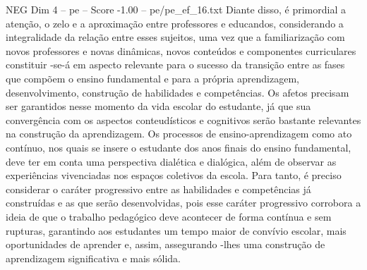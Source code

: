 \begin{textsample}{NEG Dim 4 – pe – Score -1.00 – pe/pe\_ef\_16.txt}
Diante disso, é primordial a atenção, o zelo e a aproximação entre professores e educandos, considerando a integralidade da relação entre esses sujeitos, uma vez que a familiarização com novos professores e novas dinâmicas, novos conteúdos e componentes curriculares constituir -se-á em aspecto relevante para o sucesso da transição entre as fases que compõem o ensino fundamental e para a própria aprendizagem, desenvolvimento, construção de habilidades e competências.
Os afetos precisam ser garantidos nesse momento da vida escolar do estudante, já que sua convergência com os aspectos conteudísticos e cognitivos serão bastante relevantes na construção da aprendizagem.
Os processos de ensino-aprendizagem como ato contínuo, nos quais se insere o estudante dos anos finais do ensino fundamental, deve ter em conta uma perspectiva dialética e dialógica, além de observar as experiências vivenciadas nos espaços coletivos da escola.
Para tanto, é preciso considerar o caráter progressivo entre as habilidades e competências já construídas e as que serão desenvolvidas, pois esse caráter progressivo corrobora a ideia de que o trabalho pedagógico deve acontecer de forma contínua e sem rupturas, garantindo aos estudantes um tempo maior de convívio escolar, mais oportunidades de aprender e, assim, assegurando -lhes uma construção de aprendizagem significativa e mais sólida.

\end{textsample}
